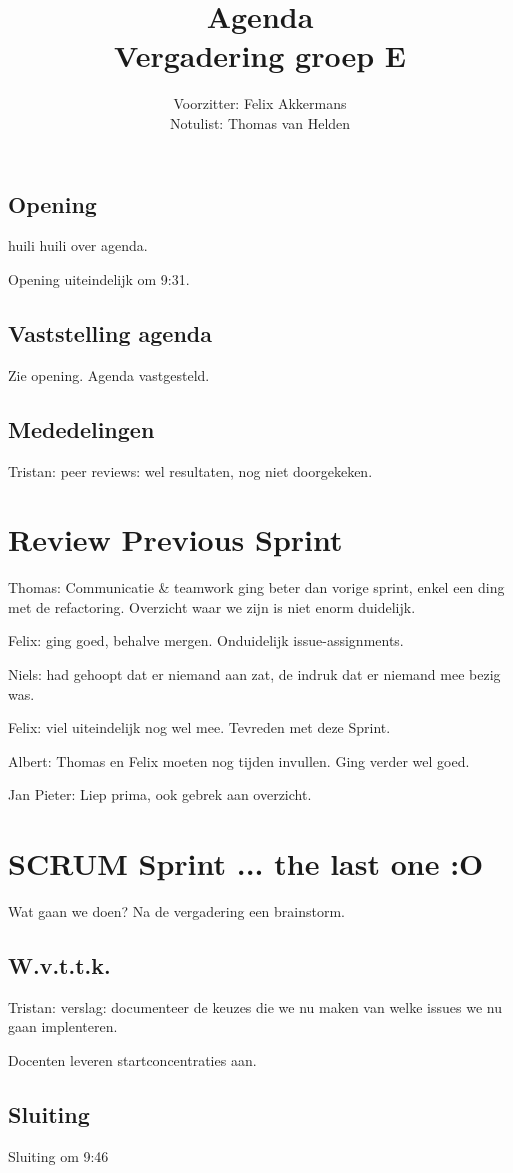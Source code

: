 \documentclass[a4paper,fullpage]{article}
\title{Agenda \\ Vergadering groep E}
\author{Voorzitter: Felix Akkermans \\ Notulist: Thomas van Helden}
\begin{document}
\maketitle
\subsection*{Opening}
huili huili over agenda.

Opening uiteindelijk om 9:31.

\subsection*{Vaststelling agenda}
Zie opening. Agenda vastgesteld.

\subsection*{Mededelingen}
Tristan: peer reviews: wel resultaten, nog niet doorgekeken.

\section{Review Previous Sprint}

Thomas: Communicatie \& teamwork ging beter dan vorige sprint, enkel een ding met de refactoring. Overzicht waar we zijn is niet enorm duidelijk. 

Felix: ging goed, behalve mergen. Onduidelijk issue-assignments.

Niels: had gehoopt dat er niemand aan zat, de indruk dat er niemand mee bezig was.

Felix: viel uiteindelijk nog wel mee. Tevreden met deze Sprint.

Albert: Thomas en Felix moeten nog tijden invullen. Ging verder wel goed.

Jan Pieter: Liep prima, ook gebrek aan overzicht.

\section{SCRUM Sprint ... the last one :O}
Wat gaan we doen? Na de vergadering een brainstorm.

\subsection*{W.v.t.t.k.}
Tristan: verslag: documenteer de keuzes die we nu maken van welke issues we nu gaan implenteren.


Docenten leveren startconcentraties aan.


\subsection*{Sluiting}
Sluiting om 9:46
\end{document}
